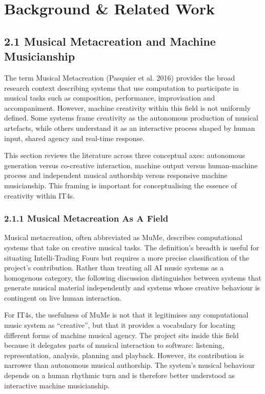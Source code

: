 \section{Background \& Related Work}\label{background-related-work}

\subsection{2.1 Musical Metacreation and Machine
Musicianship}\label{musical-metacreation-and-machine-musicianship}

The term Musical Metacreation (Pasquier et al. 2016) provides the broad
research context describing systems that use computation to participate
in musical tasks such as composition, performance, improvisation and
accompaniment. However, machine creativity within this field is not
uniformly defined. Some systems frame creativity as the autonomous
production of musical artefacts, while others understand it as an
interactive process shaped by human input, shared agency and real-time
response.

This section reviews the literature across three conceptual axes:
autonomous generation versus co-creative interaction, machine output
versus human-machine process and independent musical authorship versus
responsive machine musicianship. This framing is important for
conceptualising the essence of creativity within IT4s.

\subsubsection{2.1.1 Musical Metacreation As A
Field}\label{musical-metacreation-as-a-field}

Musical metacreation, often abbreviated as MuMe, describes computational
systems that take on creative musical tasks. The definition's breadth is
useful for situating Intelli-Trading Fours but requires a more precise
classification of the project's contribution. Rather than treating all
AI music systems as a homogenous category, the following discussion
distinguishes between systems that generate musical material
independently and systems whose creative behaviour is contingent on live
human interaction.

For IT4s, the usefulness of MuMe is not that it legitimises any
computational music system as ``creative'', but that it provides a
vocabulary for locating different forms of machine musical agency. The
project sits inside this field because it delegates parts of musical
interaction to software: listening, representation, analysis, planning
and playback. However, its contribution is narrower than autonomous
musical authorship. The system's musical behaviour depends on a human
rhythmic turn and is therefore better understood as interactive machine
musicianship.

